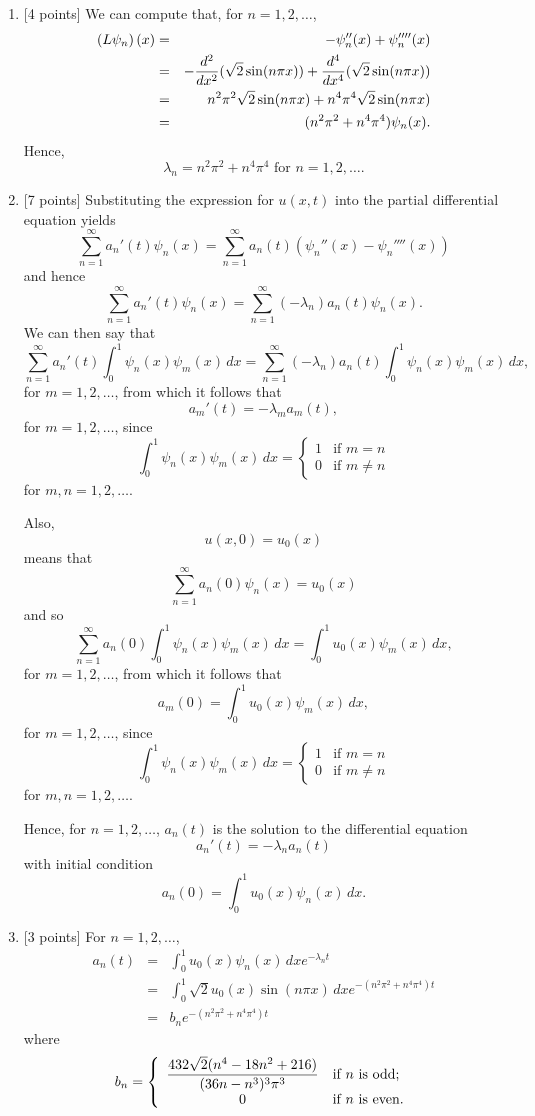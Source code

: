 \begin{solution}
\begin{enumerate}
\item {[4 points]} We can compute that, for $n=1,2,\ldots$,
\begin{eqnarray*}
\left(L \psi_n\right)(x) &=& -\psi_n''(x) + \psi_n''''(x)
\\
&=& -{d^2 \over dx^2} (\sqrt{2} \sin(n\pi x)) + {d^4\over dx^4}(\sqrt{2} \sin(n\pi x))
\\
&=& n^2\pi^2 \sqrt{2} \sin(n\pi x) + n^4\pi^4 \sqrt{2}\sin(n\pi x)
\\
&=& (n^2\pi^2 + n^4\pi^4) \psi_n(x).
\end{eqnarray*} 
Hence,
\[
\lambda_n = n^2\pi^2 + n^4\pi^4\mbox{ for }n=1,2,\ldots.
\]
\item {[7 points]} Substituting the expression for $u(x,t)$ into the partial differential equation yields
\[
\sum_{n=1}^\infty a_n'(t) \psi_n(x) = \sum_{n=1}^\infty a_n(t) (\psi_n''(x) - \psi_n''''(x))
\]
and hence
\[
\sum_{n=1}^\infty a_n'(t) \psi_n(x) = \sum_{n=1}^\infty (-\lambda_n) a_n(t) \psi_n(x).
\]
We can then say that
\[
\sum_{n=1}^\infty a_n'(t) \int_0^1\psi_n(x)\psi_m(x)\,dx = \sum_{n=1}^\infty (-\lambda_n) a_n(t) \int_0^1\psi_n(x)\psi_m(x)\,dx,
\]
for $m=1,2,\ldots$, from which it follows that
\[
a_m'(t) = -\lambda_m a_m(t),
\]
for $m=1,2,\ldots$, since
\[
\int_0^1\psi_n(x)\psi_m(x)\,dx=\left\{\begin{array}{rl}1 & \mbox{if }m=n \\ 0 & \mbox{if }m\ne n\end{array}\right.
\]
for $m,n=1,2,\ldots$.

Also,
\[
u(x,0)=u_0(x)
\]
means that
\[
\sum_{n=1}^\infty a_n(0) \psi_n(x)=u_0(x)
\]
and so
\[
\sum_{n=1}^\infty a_n(0) \int_0^1\psi_n(x)\psi_m(x)\,dx=\int_0^1u_0(x)\psi_m(x)\,dx,
\]
for $m=1,2,\ldots$, from which it follows that
\[
a_m(0)=\int_0^1u_0(x)\psi_m(x)\,dx,
\]
for $m=1,2,\ldots$, since
\[
\int_0^1\psi_n(x)\psi_m(x)\,dx=\left\{\begin{array}{rl}1 & \mbox{if }m=n \\ 0 & \mbox{if }m\ne n\end{array}\right.
\]
for $m,n=1,2,\ldots$.

Hence, for $n=1,2,\ldots$, $a_n(t)$ is the solution to the differential equation
\[
a_n'(t) = -\lambda_n a_n(t)
\]
with initial condition
\[
a_n(0)=\int_0^1u_0(x)\psi_n(x)\,dx.
\]

\item {[3 points]} For $n=1,2,\ldots$,
\begin{eqnarray*}
a_n(t)&=&\int_0^1u_0(x)\psi_n(x)\,dx e^{-\lambda_n t}
\\
&=&\int_0^1\sqrt{2}u_0(x)\sin(n\pi x)\,dx e^{-(n^2\pi^2 + n^4\pi^4)t}
\\
&=&b_n e^{-(n^2\pi^2 + n^4\pi^4)t}
\end{eqnarray*}
where
\[
b_n=\left\{ \begin{array}{cl} \displaystyle{{432\sqrt{2} (n^4-18n^2 + 216) \over (36n-n^3)^3 \pi^3}} & \mbox{if }n\mbox{ is odd}; \\0 & \mbox{if }n\mbox{ is even}.\end{array}\right.
\]


\end{enumerate}
\end{solution}
